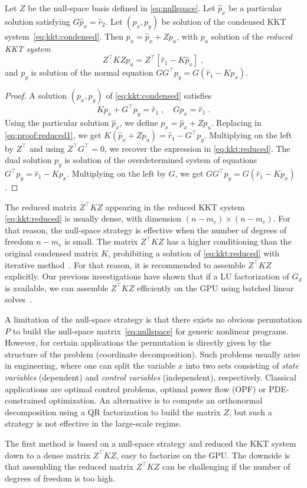 \begin{proposition}
  Let $Z$ be the null-space basis defined in \eqref{eq:nullspace}.
  Let $\hat{p}_x$ be a particular solution satisfying $G \hat{p}_x = \hat{r}_2$.
  Let $(p_x, p_y)$ be
  solution of the condensed KKT system~\eqref{eq:kkt:condensed}.
  Then $p_x= \hat{p}_x + Z p_u$, with $p_u$ solution of the \emph{reduced KKT system}
  \begin{equation}
    \label{eq:kkt:reduced}
    \tag{$K_0$}
    Z^\top K Z p_u =
    Z^\top [\hat{r}_1 - K \hat{p}_x ] \; ,
  \end{equation}
  and $p_y$ is solution of the normal equation $G G^\top p_y = G (\hat{r}_1 - K p_x)$.
\end{proposition}
\begin{proof}
  A solution $(p_x, p_y)$ of \eqref{eq:kkt:condensed} satisfies
  \begin{equation}
    \label{eq:proof:reduced1}
    K p_x + G^\top p_y = \hat{r}_1 \; , \quad
    G p_x = \hat{r}_1  \; .
  \end{equation}
  Using the particular solution $\hat{p}_x$, we define
  $p_x = \hat{p}_x + Z p_u$. Replacing in \eqref{eq:proof:reduced1},
  we get $K (\hat{p}_x + Z p_u) = \hat{r}_1 - G^\top p_y$.
  Multiplying on the left by $Z^\top$ and using $Z^\top G^\top = 0$,
  we recover the expression in \eqref{eq:kkt:reduced}.
  The dual solution $p_y$ is solution of the overdetermined
  system of equations $G^\top p_y = \hat{r}_1 - K p_x$.
  Multiplying on the left by $G$, we get $G G^\top p_y =
  G (\hat{r}_1 - K p_x)$.
\end{proof}

The reduced matrix $Z^\top K Z$ appearing in the reduced KKT system
\eqref{eq:kkt:reduced} is usually dense, with dimension $(n-m_e) \times
(n - m_e)$. For that reason, the null-space strategy is effective
when the number of degrees of freedom $n - m_e$ is small.
The matrix $Z^\top K Z$ has a higher conditioning than the original
condensed matrix $K$, prohibiting a solution of \eqref{eq:kkt:reduced}
with iterative method~\cite{gould2001solution}. For that reason,
it is recommended to assemble $Z^\top K Z$ explicitly. Our previous
investigations have shown that if a LU factorization of $G_d$ is
available, we can assemble $Z^\top K Z$ efficiently on the GPU
using batched linear solves~\cite{pacaud2022condensed}.

A limitation of the null-space strategy is that
there exists no obvious permutation $P$ to build the null-space
matrix~\eqref{eq:nullspace} for generic nonlinear programs. However, for certain applications the
permutation is directly given by the structure of the problem
(coordinate decomposition).
Such problems usually arise in engineering, where one can split
the variable $x$ into two sets consisting of \emph{state variables} (dependent)
and \emph{control variables} (independent), respectively. Classical applications
are optimal control problems, optimal power flow (OPF) or PDE-constrained optimization.
An alternative is to compute an orthonormal decomposition using a QR factorization
to build the matrix $Z$, but such a strategy is not effective in the
large-scale regime.

The first method is based on a null-space
strategy and reduced the KKT system down to a dense matrix $Z^\top K Z$, easy
to factorize on the GPU. The downside is that assembling the reduced
matrix $Z^\top K Z$ can be challenging if the number of degrees of freedom
is too high.
